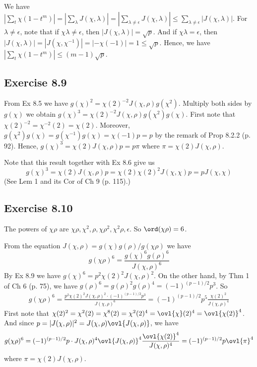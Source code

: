 \documentclass[../Chapter.tex]{subfiles}
\begin{document}
We have $|\sum_t \chi(1-t^m)| = |\sum_\lambda J(\chi,\lambda)| =  |\sum_{\lambda\neq\epsilon} J(\chi,\lambda)| \leq \sum_{\lambda\neq\epsilon} |J(\chi,\lambda)|$. For $\lambda\neq\epsilon$, note that if $\chi\lambda\neq\epsilon$, then $|J(\chi,\lambda)|=\sqrt{p}$. And if $\chi\lambda=\epsilon$, then $|J(\chi,\lambda)| = |J(\chi,\chi^{-1})| = |-\chi(-1)| = 1\leq\sqrt{p}$. Hence, we have $|\sum_t \chi(1-t^m)|\leq (m-1)\sqrt{p}$.

\subsection*{Exercise 8.9}

From Ex 8.5 we have $g(\chi)^2=\chi(2)^{-2}J(\chi,\rho)g(\chi^2)$. Multiply both sides by $g(\chi)$ we obtain $g(\chi)^3=\chi(2)^{-2}J(\chi,\rho)g(\chi^2)g(\chi)$. First note that $\chi(2)^{-2}=\chi^{-2}(2)=\chi(2)$. Moreover, $g(\chi^2)g(\chi)=g(\chi^{-1})g(\chi)=\chi(-1)p=p$ by the remark of Prop 8.2.2 (p. 92). Hence, $g(\chi)^3=\chi(2)J(\chi,\rho)p=p\pi$ where $\pi=\chi(2)J(\chi,\rho)$.

Note that this result together with Ex 8.6 give us $$g(\chi)^3=\chi(2)J(\chi,\rho)p=\chi(2)\chi(2)^2J(\chi,\chi)p=pJ(\chi,\chi)$$
(See Lem 1 and its Cor of Ch 9 (p. 115).)

\subsection*{Exercise 8.10}

The powers of $\chi\rho$ are $\chi\rho,\chi^2,\rho,\chi\rho^2,\chi^2\rho,\epsilon$. So $\ord(\chi\rho)=6$.

From the equation $J(\chi,\rho)=g(\chi)g(\rho)/g(\chi\rho)$ we have $$g(\chi\rho)^6=\frac{g(\chi)^6g(\rho)^6}{J(\chi,\rho)^6}$$ By Ex 8.9 we have $g(\chi)^6=p^2\chi(2)^2J(\chi,\rho)^2$. On the other hand, by Thm 1 of Ch 6 (p. 75), we have $g(\rho)^6=g(\rho)^2g(\rho)^4=(-1)^{(p-1)/2}p^3$. So
\begin{align*}
g(\chi\rho)^6 = \frac{p^2\chi(2)^2J(\chi,\rho)^2\cdot(-1)^{(p-1)/2}p^3}{J(\chi,\rho)^6} = (-1)^{(p-1)/2}p^5\frac{\chi(2)^2}{J(\chi,\rho)^4}
\end{align*}
First note that $\chi(2)^2=\chi^2(2)=\chi^8(2)=\chi^2(2)^4=\ovl{\chi}(2)^4=\ovl{\chi(2)}^4$. And since $p=|J(\chi,\rho)|^2=J(\chi,\rho)\ovl{J(\chi,\rho)}$, we have
\begin{align*}
g(\chi\rho)^6 = (-1)^{(p-1)/2}p\cdot J(\chi,\rho)^4\ovl{J(\chi,\rho)}^4\frac{\ovl{\chi(2)}^4}{J(\chi,\rho)^4} = (-1)^{(p-1)/2}p\ovl{\pi}^4
\end{align*}
where $\pi=\chi(2)J(\chi,\rho)$.
\end{document}
